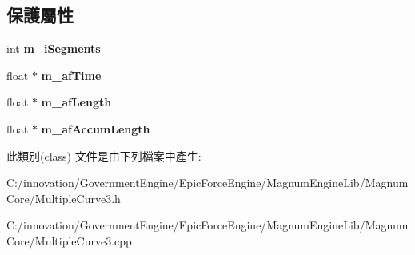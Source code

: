 \subsection*{保護屬性}
\begin{DoxyCompactItemize}
\item 
int {\bfseries m\+\_\+i\+Segments}\hypertarget{class_i_dream_sky_1_1_multiple_curve3_a08540ab6a356e2c59eab8075002716d5}{}\label{class_i_dream_sky_1_1_multiple_curve3_a08540ab6a356e2c59eab8075002716d5}

\item 
float $\ast$ {\bfseries m\+\_\+af\+Time}\hypertarget{class_i_dream_sky_1_1_multiple_curve3_ae714a9594f4b684906195d34017be102}{}\label{class_i_dream_sky_1_1_multiple_curve3_ae714a9594f4b684906195d34017be102}

\item 
float $\ast$ {\bfseries m\+\_\+af\+Length}\hypertarget{class_i_dream_sky_1_1_multiple_curve3_a2e78958c0019cc4f41021a36f398c559}{}\label{class_i_dream_sky_1_1_multiple_curve3_a2e78958c0019cc4f41021a36f398c559}

\item 
float $\ast$ {\bfseries m\+\_\+af\+Accum\+Length}\hypertarget{class_i_dream_sky_1_1_multiple_curve3_a30392b5de1eb60970043ce1568a3f689}{}\label{class_i_dream_sky_1_1_multiple_curve3_a30392b5de1eb60970043ce1568a3f689}

\end{DoxyCompactItemize}


此類別(class) 文件是由下列檔案中產生\+:\begin{DoxyCompactItemize}
\item 
C\+:/innovation/\+Government\+Engine/\+Epic\+Force\+Engine/\+Magnum\+Engine\+Lib/\+Magnum\+Core/Multiple\+Curve3.\+h\item 
C\+:/innovation/\+Government\+Engine/\+Epic\+Force\+Engine/\+Magnum\+Engine\+Lib/\+Magnum\+Core/Multiple\+Curve3.\+cpp\end{DoxyCompactItemize}
